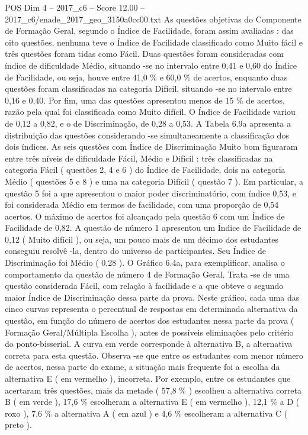 \begin{textsample}{POS Dim 4 – 2017\_c6 – Score 12.00 – 2017\_c6/enade\_2017\_geo\_3150a0cc00.txt}
As questões objetivas do Componente de Formação Geral, segundo o Índice de Facilidade, foram assim avaliadas : das oito questões, nenhuma teve o Índice de Facilidade classificado como Muito fácil e três questões foram tidas como Fácil.
Duas questões foram consideradas com índice de dificuldade Médio, situando -se no intervalo entre 0,41 e 0,60 do Índice de Facilidade, ou seja, houve entre 41,0 \% e 60,0 \% de acertos, enquanto duas questões foram classificadas na categoria Difícil, situando -se no intervalo entre 0,16 e 0,40.
Por fim, uma das questões apresentou menos de 15 \% de acertos, razão pela qual foi classificada como Muito difícil.
O Índice de Facilidade variou de 0,12 a 0,82, e o de Discriminação, de 0,28 a 0,53.
A Tabela 6.9a apresenta a distribuição das questões considerando -se simultaneamente a classificação dos dois índices.
As seis questões com Índice de Discriminação Muito bom figuraram entre três níveis de dificuldade Fácil, Médio e Difícil : três classificadas na categoria Fácil ( questões 2, 4 e 6 ) do Índice de Facilidade, dois na categoria Médio ( questões 5 e 8 ) e uma na categoria Difícil ( questão 7 ).
Em particular, a questão 5 foi a que apresentou o maior poder discriminatório, com índice 0,53, e foi considerada Médio em termos de facilidade, com uma proporção de 0,54 acertos.
O máximo de acertos foi alcançado pela questão 6 com um Índice de Facilidade de 0,82.
A questão de número 1 apresentou um Índice de Facilidade de 0,12 ( Muito difícil ), ou seja, um pouco mais de um décimo dos estudantes conseguiu resolvê -la, dentro do universo de participantes.
Seu Índice de Discriminação foi Médio ( 0,28 ).
O Gráfico 6.4a, para exemplificar, analisa o comportamento da questão de número 4 de Formação Geral.
Trata -se de uma questão considerada Fácil, com relação à facilidade e a que obteve o segundo maior Índice de Discriminação dessa parte da prova.
Neste gráfico, cada uma das cinco curvas representa o percentual de respostas em determinada alternativa da questão, em função do número de acertos dos estudantes nessa parte da prova ( Formação Geral/Múltipla Escolha ), antes de possíveis eliminações pelo critério do ponto-bisserial.
A curva em verde corresponde à alternativa B, a alternativa correta para esta questão.
Observa -se que entre os estudantes com menor número de acertos, nessa parte do exame, a situação mais frequente foi a escolha da alternativa E ( em vermelho ), incorreta.
Por exemplo, entre os estudantes que acertaram três questões, mais da metade ( 57,8 \% ) escolheu a alternativa correta B ( em verde ), 17,6 \% escolheram a alternativa E ( em vermelho ), 12,1 \% a D ( roxo ), 7,6 \% a alternativa A ( em azul ) e 4,6 \% escolheram a alternativa C ( preto ).

\end{textsample}
